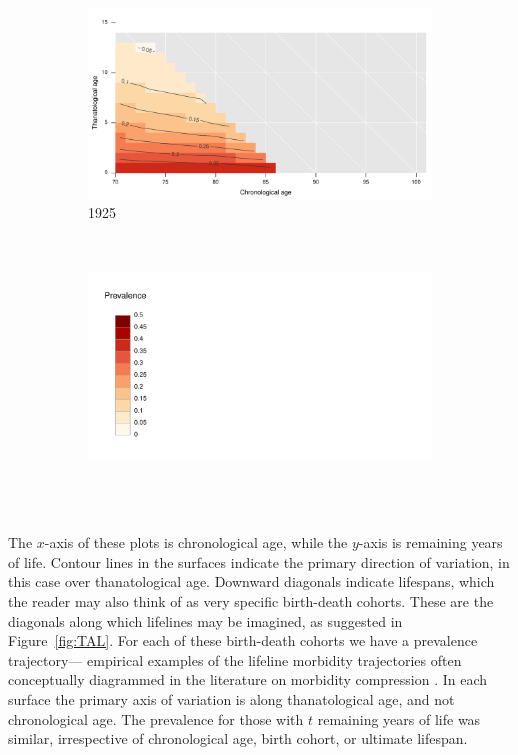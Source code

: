 \documentclass[12pt,oneside,a4paper]{article} %
\begin{document}
\begin{figure}[h!]
\begin{subfigure}{.45\textwidth}
\centering
\caption{1925}
\vspace{-1em}
\label{fig:srh1925}
\includegraphics[scale=0.3]{Figures/TALapplication/srhpoor1925.pdf}
\end{subfigure}
~
\begin{subfigure}{.45\textwidth}
\centering
\caption*{~}
\vspace{-1em}
\label{fig:srhlegend}
\includegraphics[scale=0.3]{Figures/TALapplication/Legend.pdf}
\end{subfigure}
\end{figure} 

The $x$-axis of these plots is chronological age, while the $y$-axis is
remaining years of life. Contour lines in the surfaces indicate the
primary direction of variation, in this case over thanatological age. Downward
diagonals indicate lifespans, which the reader may also think of as very
specific birth-death cohorts. These are the diagonals along which lifelines may
be imagined, as suggested in Figure~\ref{fig:TAL}. For each of these birth-death cohorts we have a prevalence trajectory--- empirical examples of the lifeline morbidity trajectories
often conceptually diagrammed in the literature on morbidity compression
\citep[e.g.,][]{fries2005frailty}.
In each surface the primary axis of variation is along thanatological age, and not chronological age. The prevalence
for those with $t$ remaining years of life was similar, irrespective of
chronological age, birth cohort, or ultimate lifespan. 
\end{document}
